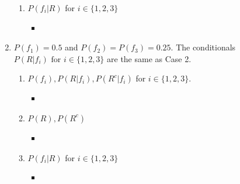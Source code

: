 \documentclass[letterpaper]{article}
\begin{document}
\begin{enumerate}
\begin{enumerate}
    \item $P(f_i|R)$ for $i \in \{1,2,3\}$
      \begin{itemize}
        \item
      \end{itemize}
  \end{enumerate}

  \item $P(f_1) = 0.5$ and $P(f_2)=P(f_3) = 0.25$.  The conditionals $P(R|f_i) \textrm{ for } i\in \{1,2,3\}$ are the same as Case 2.

  \begin{enumerate}
    \item $P(f_i),P(R|f_i),P(R^c|f_i)$ for $i \in \{1,2,3\}$.
      \begin{itemize}
        \item
      \end{itemize}

    \item $P(R), P(R^c)$
      \begin{itemize}
        \item
      \end{itemize}

    \item $P(f_i|R)$ for $i \in \{1,2,3\}$
      \begin{itemize}
        \item
      \end{itemize}
  \end{enumerate}

\end{enumerate}
\end{document}
